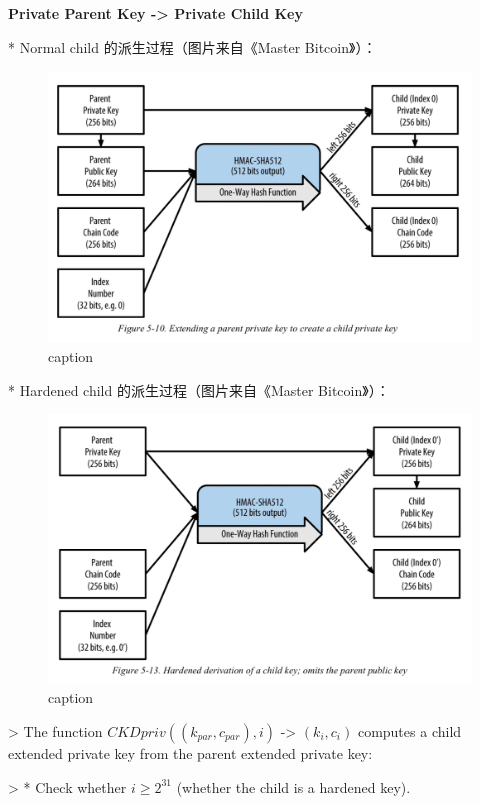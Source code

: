 \documentclass{article}
\begin{document}
\textbf{Private Parent Key -> Private Child Key}
 
* Normal child 的派生过程（图片来自《Master Bitcoin》）：

\begin{figure}[h]
\centering
\includegraphics[width=\textwidth]{./CKDpriv.png}
\caption{caption}\label{fig-parsesig}
\end{figure}

* Hardened child 的派生过程（图片来自《Master Bitcoin》）：

\begin{figure}[h]
\centering
\includegraphics[width=\textwidth]{./CKDpriv2.png}
\caption{caption}\label{fig-parsesig}
\end{figure}

> The function $CKDpriv((k_{par}, c_{par}), i)$ -> $(k
_i, c_i)$ computes a child extended private key from the parent extended private key:

> * Check whether $i ≥ 2^{31}$ (whether the child is a hardened key).  
\end{document}
